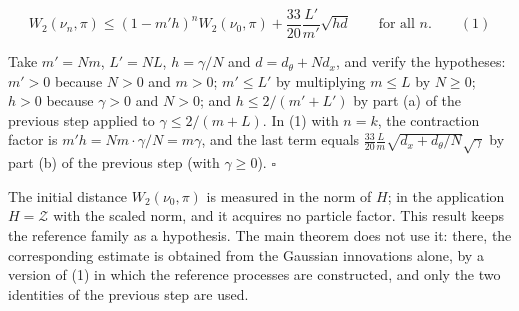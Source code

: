 \documentclass[11pt,a4paper]{article}
\begin{document}
\[W_2(\nu_n,\pi)\le(1-m'h)^nW_2(\nu_0,\pi)+\frac{33}{20}\frac{L'}{m'}\sqrt{hd}\qquad\text{for all }n.\qquad(1)\]


Take \(m'=Nm\), \(L'=NL\), \(h=\gamma/N\) and \(d=d_\theta+Nd_x\), and verify the hypotheses: \(m'>0\) because \(N>0\) and \(m>0\); \(m'\le L'\) by multiplying \(m\le L\) by \(N\ge0\); \(h>0\) because \(\gamma>0\) and \(N>0\); and \(h\le2/(m'+L')\) by part (a) of the previous step applied to \(\gamma\le2/(m+L)\). In (1) with \(n=k\), the contraction factor is \(m'h=Nm\cdot\gamma/N=m\gamma\), and the last term equals \(\frac{33}{20}\frac Lm\sqrt{d_x+d_\theta/N}\sqrt\gamma\) by part (b) of the previous step (with \(\gamma\ge0\)). \(\square\)




The initial distance \(W_2(\nu_0,\pi)\) is measured in the norm of \(H\); in the application \(H=\mathcal Z\) with the scaled norm, and it acquires no particle factor. This result keeps the reference family as a hypothesis. The main theorem does not use it: there, the corresponding estimate is obtained from the Gaussian innovations alone, by a version of (1) in which the reference processes are constructed, and only the two identities of the previous step are used.
\end{document}
